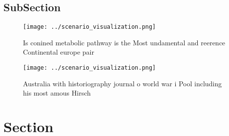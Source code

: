 \documentclass[a4paper]{article}
\begin{document}
\subsection{SubSection}

\begin{figure}
\centering
\texttt{[image: ../scenario\_visualization.png]}
\caption{Is conined metabolic pathway is the Most undamental and reerence Continental europe pair 
}
\end{figure}
 
\begin{figure}
\centering
\texttt{[image: ../scenario\_visualization.png]}
\caption{Australia with historiography journal o world war i Pool including his most amous Hirsch 
}
\end{figure}
 
\section{Section}
\end{document}
